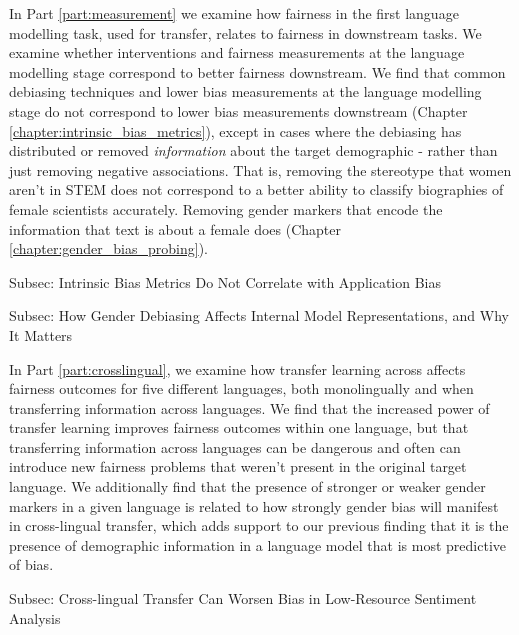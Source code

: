 In Part \ref{part:measurement} we examine how fairness in the first language modelling task, used for transfer, relates to fairness in downstream tasks. We examine whether interventions and fairness measurements at the language modelling stage correspond to better fairness downstream. We find that common debiasing techniques and lower bias measurements at the language modelling stage do not correspond to lower bias measurements downstream (Chapter \ref{chapter:intrinsic_bias_metrics}), except in cases where the debiasing has distributed or removed \textit{information} about the target demographic - rather than just removing negative associations. That is, removing the stereotype that women aren't in STEM does not correspond to a better ability to classify biographies of female scientists accurately. Removing gender markers that encode the information that text is about a female does (Chapter \ref{chapter:gender_bias_probing}).

Subsec: Intrinsic Bias Metrics Do Not Correlate with Application Bias

Subsec: How Gender Debiasing Affects Internal Model Representations, and Why It Matters

In Part \ref{part:crosslingual}, we examine how transfer learning across affects fairness outcomes for five different languages, both monolingually and when transferring information across languages. We find that the increased power of transfer learning improves fairness outcomes within one language, but that transferring information across languages can be dangerous and often can introduce new fairness problems that weren't present in the original target language. We additionally find that the presence of stronger or weaker gender markers in a given language is related to how strongly gender bias will manifest in cross-lingual transfer, which adds support to our previous finding that it is the presence of demographic information in a language model that is most predictive of bias.

Subsec: Cross-lingual Transfer Can Worsen Bias in Low-Resource Sentiment Analysis